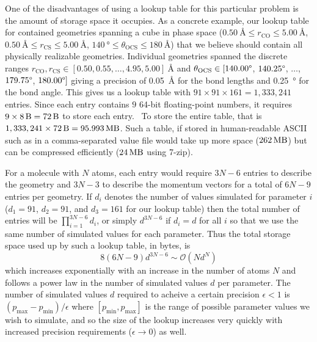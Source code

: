 One of the disadvantages of using a lookup table for this particular problem is the amount of storage space it occupies.  As a concrete example, our lookup table for  contained geometries spanning a cube in phase space ($\SI{0.50}{\angstrom} \le r_\mathrm{CO} \le \SI{5.00}{\angstrom}$, $\SI{0.50}{\angstrom} \le r_\mathrm{CS} \le \SI{5.00}{\angstrom}$, $\SI{140}{\degree} \le \theta_\mathrm{OCS} \le \SI{180}{\angstrom}$) that we believe should contain all physically realizable geometries. Individual geometries spanned the discrete ranges $r_\mathrm{CO}, r_\mathrm{CS} \in [0.50, 0.55, \dots, 4.95, 5.00] \SI{}{\angstrom}$ and $\theta_\mathrm{OCS} \in [140.00\degree$, $140.25\degree$, $\dots$, $179.75\degree$, $180.00\degree]$ giving a precision of \SI{0.05}{\angstrom} for the bond lengths and \SI{0.25}{\degree} for the bond angle. This gives us a lookup table with $91 \times 91 \times 161 = 1,333,241$ entries. Since each entry contains $9$ 64-bit floating-point numbers, it requires $9 \times \SI{8}{\byte} = \SI{72}{\byte}$ to store each entry.\footnotemark~ To store the entire table, that is $1,333,241 \times \SI{72}{\byte} = \SI{95.993}{\mega\byte}$. Such a table, if stored in human-readable ASCII such as in a comma-separated value file would take up more space ($\SI{262}{\mega\byte}$) but can be compressed efficiently ($\SI{24}{\mega\byte}$ using 7-zip).


For a molecule with $N$ atoms, each entry would require $3N-6$ entries to describe the geometry and $3N-3$ to describe the momentum vectors for a total of $6N-9$ entries per geometry. If $d_i$ denotes the number of values simulated for parameter $i$ ($d_1 = 91$, $d_2 = 91$, and $d_3 = 161$ for our lookup table) then the total number of entries will be $\displaystyle \prod\limits_{i=1}^{3N-6} d_i$, or simply $d^{3N-6}$ if $d_i = d$ for all $i$ so that we use the same number of simulated values for each parameter. Thus the total storage space used up by such a lookup table, in bytes, is
\begin{equation}
8(6N-9)d^{3N-6}\sim \mathcal{O}(Nd^{N})
\end{equation}
which increases exponentially with an increase in the number of atoms $N$ and follows a power law in the number of simulated values $d$ per parameter. The number of simulated values $d$ required to acheive a certain precision $\epsilon < 1$ is $(p_\mathrm{max} - p_\mathrm{min})/\epsilon$ where $[p_\mathrm{min}, p_\mathrm{max}]$ is the range of possible parameter values we wish to simulate, and so the size of the lookup increases very quickly with increased precision requirements ($\epsilon \rightarrow 0$) as well.

